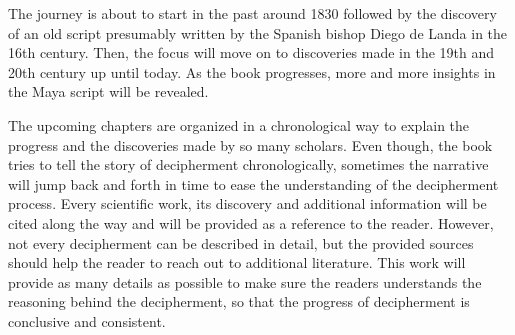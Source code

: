 \documentclass[../main.tex]{subfiles}
\begin{document}
The journey is about to start in the past around 1830
followed by the discovery of an old script presumably written by the Spanish bishop Diego de Landa 
in the 16th century.
Then, the focus will move on to discoveries made in the 19th and 20th century up until today.
As the book progresses, more and more insights in the Maya script will be revealed.

The upcoming chapters are organized in a chronological way to explain the progress and the 
discoveries made by so many scholars.
Even though, the book tries to tell the story of decipherment chronologically, sometimes
the narrative will jump back and forth in time to ease the understanding of 
the decipherment process.
Every scientific work, its discovery and additional information will be cited along the way and 
will be provided as a reference to the reader.
However, not every decipherment can be described in detail, but the provided sources should help 
the reader to reach out to additional literature.
This work will provide as many details as possible to make sure the readers understands the 
reasoning behind the decipherment, so that the progress of decipherment is 
conclusive and consistent.
\end{document}
